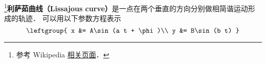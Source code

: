 
\begin{issues}
\issueDraft
\end{issues}

\footnote{参考 Wikipedia \href{https://en.wikipedia.org/wiki/Lissajous_curve}{相关页面}．}\textbf{利萨茹曲线（Lissajous curve）}是一点在两个垂直的方向分别做相简谐运动形成的轨迹． 可以用以下参数方程表示
\begin{equation}
\leftgroup{
x &= A\sin(a t + \phi)\\
y &= B\sin(b t)
}\end{equation}

